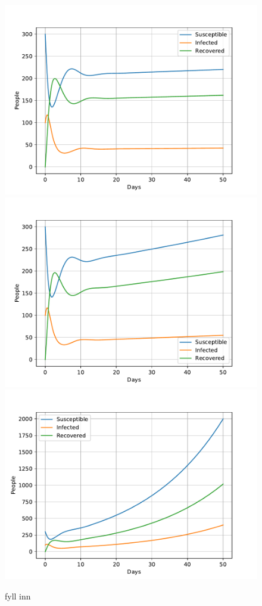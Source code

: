 \documentclass[a4paper]{article}
\begin{document}
\begin{figure}[!htb]
	\centering 
	\includegraphics[scale=0.56]{../plots/opp_c_h_10000.pdf}
	\includegraphics[scale=0.56]{../plots/opp_c_h_20000.pdf}	
	\includegraphics[scale=0.56]{../plots/opp_c_h_100000.pdf}
	\caption{fyll inn}
	\label{opp_c2}
\end{figure}
\end{document}
